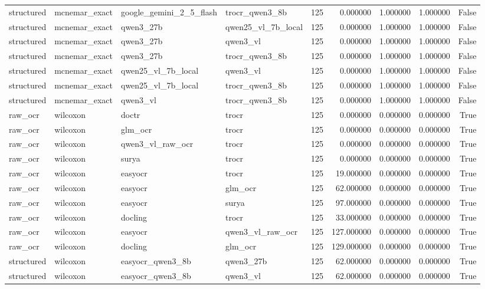 \begin{tabular}{llllrrrrr}
structured & mcnemar\_exact & google\_gemini\_2\_5\_flash & trocr\_qwen3\_8b & 125 & 0.000000 & 1.000000 & 1.000000 & False \\
structured & mcnemar\_exact & qwen3\_27b & qwen25\_vl\_7b\_local & 125 & 0.000000 & 1.000000 & 1.000000 & False \\
structured & mcnemar\_exact & qwen3\_27b & qwen3\_vl & 125 & 0.000000 & 1.000000 & 1.000000 & False \\
structured & mcnemar\_exact & qwen3\_27b & trocr\_qwen3\_8b & 125 & 0.000000 & 1.000000 & 1.000000 & False \\
structured & mcnemar\_exact & qwen25\_vl\_7b\_local & qwen3\_vl & 125 & 0.000000 & 1.000000 & 1.000000 & False \\
structured & mcnemar\_exact & qwen25\_vl\_7b\_local & trocr\_qwen3\_8b & 125 & 0.000000 & 1.000000 & 1.000000 & False \\
structured & mcnemar\_exact & qwen3\_vl & trocr\_qwen3\_8b & 125 & 0.000000 & 1.000000 & 1.000000 & False \\
raw\_ocr & wilcoxon & doctr & trocr & 125 & 0.000000 & 0.000000 & 0.000000 & True \\
raw\_ocr & wilcoxon & glm\_ocr & trocr & 125 & 0.000000 & 0.000000 & 0.000000 & True \\
raw\_ocr & wilcoxon & qwen3\_vl\_raw\_ocr & trocr & 125 & 0.000000 & 0.000000 & 0.000000 & True \\
raw\_ocr & wilcoxon & surya & trocr & 125 & 0.000000 & 0.000000 & 0.000000 & True \\
raw\_ocr & wilcoxon & easyocr & trocr & 125 & 19.000000 & 0.000000 & 0.000000 & True \\
raw\_ocr & wilcoxon & easyocr & glm\_ocr & 125 & 62.000000 & 0.000000 & 0.000000 & True \\
raw\_ocr & wilcoxon & easyocr & surya & 125 & 97.000000 & 0.000000 & 0.000000 & True \\
raw\_ocr & wilcoxon & docling & trocr & 125 & 33.000000 & 0.000000 & 0.000000 & True \\
raw\_ocr & wilcoxon & easyocr & qwen3\_vl\_raw\_ocr & 125 & 127.000000 & 0.000000 & 0.000000 & True \\
raw\_ocr & wilcoxon & docling & glm\_ocr & 125 & 129.000000 & 0.000000 & 0.000000 & True \\
structured & wilcoxon & easyocr\_qwen3\_8b & qwen3\_27b & 125 & 62.000000 & 0.000000 & 0.000000 & True \\
structured & wilcoxon & easyocr\_qwen3\_8b & qwen3\_vl & 125 & 62.000000 & 0.000000 & 0.000000 & True \\

\end{tabular}
